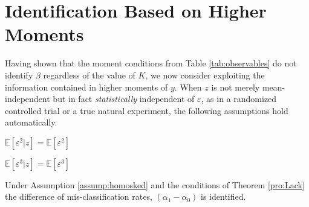 \section{Identification Based on Higher Moments}
Having shown that the moment conditions from Table \ref{tab:observables} do not identify $\beta$ regardless of the value of $K$, we now consider exploiting the information contained in higher moments of $y$. 
When $z$ is not merely mean-independent but in fact \emph{statistically} independent of $\varepsilon$, as in a randomized controlled trial or a true natural experiment, the following assumptions hold automatically.
\begin{assump}
  $\mathbb{E}[\varepsilon^2|z]=\mathbb{E}[\varepsilon^2]$
  \label{assump:homosked}
\end{assump}
\begin{assump}
  $\mathbb{E}[\varepsilon^3|z]=\mathbb{E}[\varepsilon^3]$
  \label{assump:skew}
\end{assump}
\begin{thm}
  \label{pro:homosked}
  Under Assumption \ref{assump:homosked} and the conditions of Theorem \ref{pro:Lack} the difference of mis-classification rates, $(\alpha_1 - \alpha_0)$ is identified. 
\end{thm}
